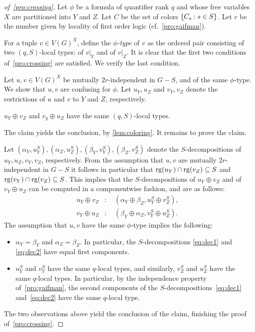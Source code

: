 \begin{proof}[of~\cref{pro:crossing}]
Let $\phi$ be a formula
	of  quantifier rank $q$
  and whose free variables $X$ are partitioned into $Y$ and $Z$.
  Let $C$ be the set of colors $\{C_s:s\in S\}$.
  Let $r$ be the number given by locality of first order logic (cf.~\cref{pro:gaifman}).
  

	For a tuple $v\in V(G)^X$, define the \emph{$\phi$-type} of $v$
  as the ordered pair consisting of two $(q,S)$-local types: of $v|_Y$  and of $v|_Z$. 
 It is clear that the first two conditions of~\cref{pro:crossing} are satisfied. We verify the last condition.
	
Let $u,v\in V(G)^X$ be mutually $2r$-independent in $G-S$,
and of the same $\phi$-type. We show that $u,v$
are confusing for $\phi$. 
Let $u_Y,u_Z$ and $v_Y,v_Z$ denote the restrictions of $u$ and $v$ to $Y$ and $Z$, respectively. 

\begin{claim}
 $u_Y\oplus v_Z$ and $v_y\oplus u_Z$ have the same 
$(q,S)$-local types.  
\end{claim}
The claim yields the conclusion, by \cref{lem:coloring}. It remains to prove the claim.
\medskip

Let $(\alpha_Y,u_Y^S),(\alpha_Z,u_Z^S),(\beta_Y,v_Y^S),(\beta_Z,v_Z^S)$ denote the $S$-decompositions of  $u_Y,u_Z,v_Y,v_Z$, respectively. 
From the assumption that $u,v$ are mutually $2r$-independent in $G-S$ it follows in particular that
 $\mathrm{rg}(u_Y)\cap\mathrm{rg}(v_Z)\subseteq S$
and  $\mathrm{rg}(v_Y)\cap \mathrm{rg}(v_Z)\subseteq S$.
This implies that the $S$-decompositions of $u_Y\oplus v_Z$
and of  $v_Y\oplus u_Z$ can be computed in a componentwise fashion, and are as follows:
\begin{align}
u_Y\oplus v_Z &:\quad (\alpha_Y\oplus \beta_Z,  u_Y^S\oplus v_Z^S)\label{eq:dec1},\\  
v_Y\oplus u_Z &:\quad (\beta_Y\oplus \alpha_Z, v_Y^S\oplus u_Z^S)\label{eq:dec2}.
\end{align}
The assumption that $u,v$ have the same $\phi$-type implies the following:
\begin{itemize}
  \item  $\alpha_Y=\beta_Y$ and $\alpha_Z=\beta_Z$.
  In particular, the $S$-decompositions
  \eqref{eq:dec1} and \eqref{eq:dec2}  have equal first components.
  
    \item  $u_Y^S$ and  $v_Y^S$ have 
  the same $q$-local types, and similarly,
  $v_Z^S$ and  $u_Z^S$ have the same $q$-local types.
  In particular, by the independence property of~\cref{pro:gaifman}, the second components of the $S$-decompositions~\eqref{eq:dec1} and~\eqref{eq:dec2}
  have the same $q$-local type. 
\end{itemize}
The two observations above yield the conclusion of the claim, finishing the proof of~\cref{pro:crossing}.
\end{proof}



